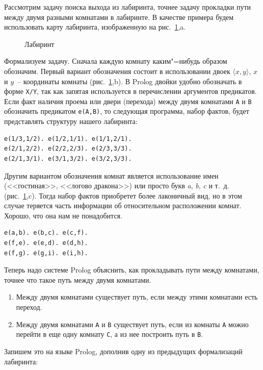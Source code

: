 \documentclass[a4paper,14pt, openany, twoside, draft]{extbook} %
\begin{document}
Рассмотрим задачу поиска выхода из лабиринта, точнее задачу прокладки пути между двумя разными комнатами в лабиринте.  В качестве примера будем использовать карту лабиринта, изображенную на рис.~\ref{fig:labyrinth},a.
\begin{figure}[hbt]
  \centering
  \def\svgwidth{\columnwidth} %
  \itshape\small
  \def\svgwidth{\columnwidth}
  
  \caption{Лабиринт}
  \label{fig:labyrinth}
\end{figure}

Формализуем задачу.  Сначала каждую комнату каким"=нибудь образом обозначим.  Первый вариант обозначения состоит в использовании двоек $\langle x,y\rangle$, $x$ и $y$~-- координаты комнаты (рис.~\ref{fig:labyrinth},b).  В Prolog двойки удобно обозначать в форме \texttt{X/Y}, так как запятая используется в перечислении аргументов предикатов.  Если факт наличия проема или двери (перехода) между двумя комнатами \texttt{A} и \texttt{B} обозначить предикатом \texttt{e(A,B)}, то следующая программа, набор фактов, будет представлять структуру нашего лабиринта:

\begin{verbatim}
e(1/3,1/2). e(1/2,1/1). e(1/1,2/1).
e(2/1,2/2). e(2/2,2/3). e(2/3,3/3).
e(2/1,3/1). e(3/1,3/2). e(3/2,3/3).
\end{verbatim}

Другим вариантом обозначения комнат является использование имен (<<гостиная>>, <<логово дракона>>) или просто букв \textit{a}, \textit{b}, \textit{c} и т.~д. (рис.~\ref{fig:labyrinth},c).  Тогда набор фактов приобретет более лаконичный вид, но в этом случае теряется часть информации об относительном расположении комнат.  Хорошо, что она нам не понадобится.

\begin{verbatim}
e(a,b). e(b,c). e(c,f).
e(f,e). e(e,d). e(d,h).
e(f,g). e(g,i). e(i,h).
\end{verbatim}

Теперь надо системе Prolog объяснить, как прокладывать пути между комнатами, точнее что такое путь между двумя комнатами.
\begin{enumerate}
\item Между двумя комнатами существует путь, если между этими комнатами есть переход.
\item Между двумя комнатами \texttt{A} и \texttt{B} существует путь, если из комнаты \texttt{A} можно перейти в еще одну комнату \texttt{C}, а из нее построить путь в \texttt{B}.
\end{enumerate}
Запишем это на языке Prolog, дополнив одну из предыдущих формализаций лабиринта:
\end{document}
